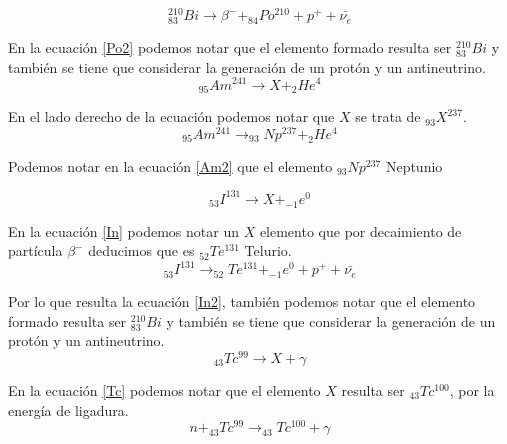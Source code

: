 \documentclass[]{article}
\begin{document}
\begin{equation}
     _{83}^{210}Bi \to \beta^- + _{84}Po^{210}+p^+ +\bar{\nu_e}   
  \label{Po2}
\end{equation}

En la ecuación \ref{Po2} podemos notar que el elemento formado resulta ser $_{83}^{210}Bi$ y también se tiene que considerar la generación de un protón y un antineutrino.\\

\begin{equation}
   _{95}Am^{241} \to X+ _2He^4
   \label{Am}
\end{equation}

En el lado derecho de la ecuación podemos notar que $X$ se trata de $_{93}X^{237}$.\\

\begin{equation}
_{95}Am^{241} \to _{93}Np^{237}+ _2He^4
\label{Am2}
\end{equation}

Podemos notar en la ecuación \ref{Am2} que el elemento $_{93}Np^{237}$ Neptunio

\begin{equation}
   _{53}I^{131} \to X + _{-1}e^0
   \label{In}
\end{equation}

En la ecuación \ref{In} podemos notar un $X$ elemento que por decaimiento de partícula $\beta^-$ deducimos que es $_{52}Te^{131}$ Telurio.\\


\begin{equation}
_{53}I^{131} \to _{52}Te^{131} + _{-1}e^0+p^+ +\bar{\nu_e}
\label{In2}
\end{equation}

Por lo que resulta la ecuación \ref{In2}, también podemos notar que el elemento formado resulta ser $_{83}^{210}Bi$ y también se tiene que considerar la generación de un protón y un antineutrino.\\

\begin{equation}
  _{43}Tc^{99} \to X + \gamma
  \label{Tc}
\end{equation}

En la ecuación \ref{Tc} podemos notar que el elemento $X$ resulta ser $_{43}Tc^{100}$, por la energía de ligadura.\\

\begin{equation}
n + _{43}Tc^{99} \to _{43}Tc^{100} + \gamma
\label{Tc1}
\end{equation}
\end{document}
